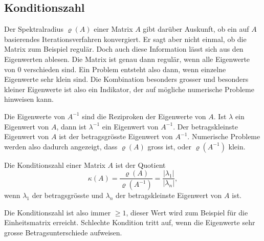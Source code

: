 %
%
\subsection{Konditionszahl
\label{buch:subsection:konditionszahl}}
Der Spektralradius $\varrho(A)$ einer Matrix $A$ gibt darüber Auskunft,
ob ein auf $A$ basierendes Iterationsverfahren konvergiert.
Er sagt aber nicht einmal, ob die Matrix zum Beispiel regulär.
Doch auch diese Information lässt sich aus den Eigenwerten ablesen.
Die Matrix ist genau dann regulär, wenn alle Eigenwerte von $0$ verschieden
sind.
Ein Problem entsteht also dann, wenn einzelne Eigenwerte sehr klein sind.
Die Kombination besonders grosser und besonders kleiner Eigenwerte 
ist also ein Indikator, der auf mögliche numerische Probleme hinweisen kann.

Die Eigenwerte von $A^{-1}$ sind die Reziproken der Eigenwerte von $A$.
Ist $\lambda$ ein Eigenwert von $A$, dann ist $\lambda^{-1}$ ein Eigenwert
von $A^{-1}$.
Der betragskleinste Eigenwert von $A$ ist der betragsgrösste Eigenwert von
$A^{-1}$.
Numerische Probleme werden also dadurch angezeigt, dass $\varrho(A)$ gross
ist, oder $\varrho(A^{-1})$ klein.

\begin{definition}
\label{buch:konditionszahl:definition}
Die Konditionszahl einer Matrix $A$ ist der Quotient
\[
\kappa(A)
=
\frac{\varrho(A)}{\varrho(A^{-1})}
=
\frac{|\lambda_1|}{|\lambda_n|},
\]
wenn $\lambda_1$ der betragsgrösste und $\lambda_n$ der betragskleinste
Eigenwert von $A$ ist.
\end{definition}

Die Konditionszahl ist also immer $\ge 1$, dieser Wert wird zum Beispiel
für die Einheitsmatrix erreicht.
Schlechte Kondition tritt auf, wenn die Eigenwerte sehr grosse
Betragsunterschiede aufweisen.


